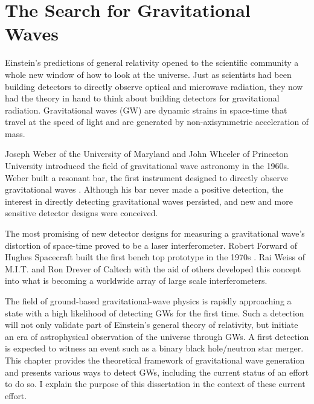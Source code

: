 \chapter{The Search for Gravitational Waves}


Einstein's predictions of general relativity opened to the scientific
community a whole new window of how to look at the universe. Just as
scientists had been building detectors to directly observe optical and
microwave radiation, they now had the theory in hand to think about
building detectors for gravitational radiation. Gravitational waves
(GW) are dynamic strains in space-time that travel at the speed of
light and are generated by non-axisymmetric acceleration of mass.

Joseph Weber of the University of Maryland and John Wheeler of
Princeton University introduced the field of gravitational wave
astronomy in the 1960s. Weber built a resonant bar, the first
instrument designed to directly observe gravitational waves
\cite{Weber1960Detection}. Although his bar never made a positive
detection, the interest in directly detecting gravitational waves
persisted, and new and more sensitive detector designs were conceived.

The most promising of new detector designs for measuring a
gravitational wave's distortion of space-time proved to be a laser
interferometer. Robert Forward of Hughes Spacecraft built the first
bench top prototype in the 1970s \cite{Forward1978Wideband}. Rai Weiss
of M.I.T. and Ron Drever of Caltech with the aid of others developed
this concept into what is becoming a worldwide array of large scale
interferometers.

The field of ground-based gravitational-wave physics is rapidly
approaching a state with a high likelihood of detecting GWs for the
first time. Such a detection will not only validate part of Einstein's
general theory of relativity, but initiate an era of astrophysical
observation of the universe through GWs.  A first detection is
expected to witness an event such as a binary black hole/neutron star
merger. This chapter provides the theoretical framework of
gravitational wave generation and presents various ways to detect GWs,
including the current status of an effort to do so. I explain the
purpose of this dissertation in the context of these current effort.


